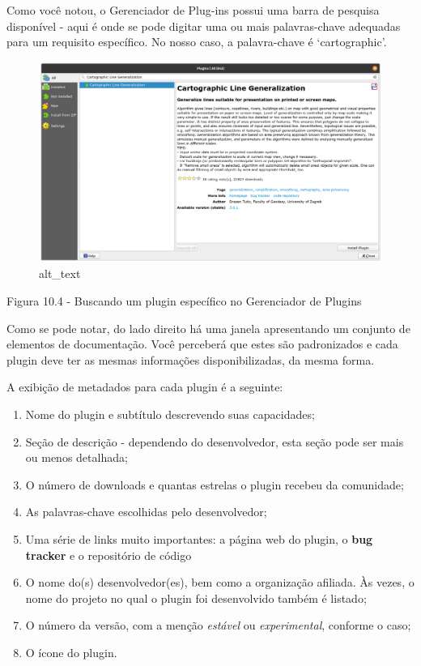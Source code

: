 \documentclass[
  portuguese,
]{krantz}
\providecommand{\tightlist}{%
  \setlength{\itemsep}{0pt}\setlength{\parskip}{0pt}}
\begin{document}
Como você notou, o Gerenciador de Plug-ins possui uma barra de pesquisa disponível - aqui é onde se pode digitar uma ou mais palavras-chave adequadas para um requisito específico. No nosso caso, a palavra-chave é `cartographic'.

\begin{figure}
\centering
\includegraphics{media/modulo10/fig104.png}
\caption{alt\_text}
\end{figure}

Figura 10.4 - Buscando um plugin específico no Gerenciador de Plugins

Como se pode notar, do lado direito há uma janela apresentando um conjunto de elementos de documentação. Você perceberá que estes são padronizados e cada plugin deve ter as mesmas informações disponibilizadas, da mesma forma.

A exibição de metadados para cada plugin é a seguinte:

\begin{enumerate}
\def\labelenumi{\arabic{enumi}.}
\tightlist
\item
  Nome do plugin e subtítulo descrevendo suas capacidades;
\item
  Seção de descrição - dependendo do desenvolvedor, esta seção pode ser mais ou menos detalhada;
\item
  O número de downloads e quantas estrelas o plugin recebeu da comunidade;
\item
  As palavras-chave escolhidas pelo desenvolvedor;
\item
  Uma série de links muito importantes: a página web do plugin, o \textbf{bug tracker} e o repositório de código
\item
  O nome do(s) desenvolvedor(es), bem como a organização afiliada. Às vezes, o nome do projeto no qual o plugin foi desenvolvido também é listado;
\item
  O número da versão, com a menção \emph{estável} ou \emph{experimental}, conforme o caso;
\item
  O ícone do plugin.
\end{enumerate}
\end{document}
